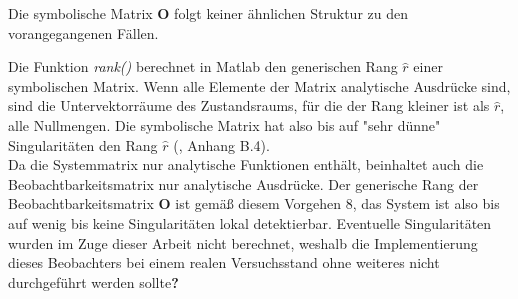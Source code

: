 \documentclass[times, 10pt,twocolumn]{article}
\begin{document}
	Die symbolische Matrix $\bm O$ folgt keiner ähnlichen Struktur zu den vorangegangenen Fällen.  \\

	Die Funktion \textit{rank()} berechnet in Matlab den generischen Rang $\hat r$ einer symbolischen Matrix. Wenn alle Elemente der Matrix analytische Ausdrücke sind, sind die Untervektorräume des Zustandsraums, für die der Rang kleiner ist als $\hat r$, alle Nullmengen. Die symbolische Matrix hat also bis auf "sehr dünne" Singularitäten den Rang $\hat r$ (\cite{ex3}, Anhang B.4). \\
	Da die Systemmatrix nur analytische Funktionen enthält, beinhaltet auch die Beobachtbarkeitsmatrix nur analytische Ausdrücke. 
	Der generische Rang der Beobachtbarkeitsmatrix $\bm O$ ist gemäß diesem Vorgehen 8, das System ist also bis auf wenig bis keine Singularitäten lokal detektierbar. Eventuelle Singularitäten wurden im Zuge dieser Arbeit nicht berechnet, weshalb die Implementierung dieses Beobachters bei einem realen Versuchsstand ohne weiteres nicht durchgeführt werden sollte\textbf{?} \\
	
\end{document}
